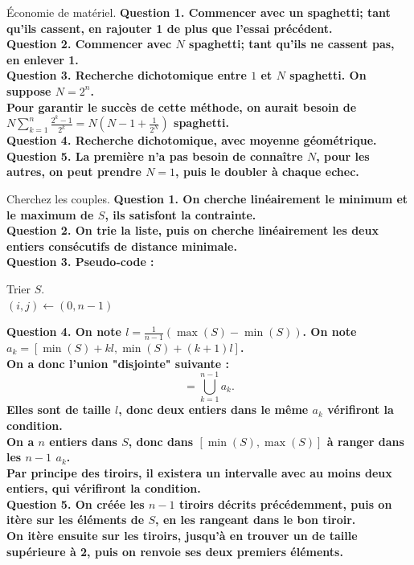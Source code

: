 \documentclass[french, 11pt]{article}
\begin{document}
\begin{exercice}{Économie de matériel.}{}
    \bf{Question 1.} Commencer avec un spaghetti; tant qu'ils cassent, en rajouter 1 de plus que l'essai précédent.\\
    \bf{Question 2.} Commencer avec $N$ spaghetti; tant qu'ils ne cassent pas, en enlever 1.\\
    \bf{Question 3.} Recherche dichotomique entre $1$ et $N$ spaghetti. On suppose $N=2^n$.\\
    Pour garantir le succès de cette méthode, on aurait besoin de $N\sum_{k=1}^n\frac{2^k-1}{2^k}=N(N-1+\frac{1}{2^N})$ spaghetti.\\
    \bf{Question 4.} Recherche dichotomique, avec moyenne géométrique.\\
    \bf{Question 5.} La première n'a pas besoin de connaître $N$, pour les autres, on peut prendre $N=1$, puis le doubler à chaque echec. 
\end{exercice}

\begin{exercice}{Cherchez les couples.}{}
    \bf{Question 1.} On cherche linéairement le minimum et le maximum de $S$, ils satisfont la contrainte.\\
    \bf{Question 2.} On trie la liste, puis on cherche linéairement les deux entiers consécutifs de distance minimale.\\
    \bf{Question 3.} Pseudo-code :\\
    \begin{algorithm}[H]
        \caption{}
        Trier $S$.\\
        $(i,j)\gets(0,n-1)$\\
    \end{algorithm}
    \bf{Question 4.} On note $l=\frac{1}{n-1}(\max(S)-\min(S))$. On note $a_k=[\min(S)+kl,\min(S)+(k+1)l]$.\\
    On a donc l'union "disjointe" suivante :
    \begin{equation*}
        [\min(S),\max(S)]=\bigcup_{k=1}^{n-1}a_k.
    \end{equation*}
    Elles sont de taille $l$, donc deux entiers dans le même $a_k$ vérifiront la condition.\\
    On a $n$ entiers dans $S$, donc dans $[\min(S),\max(S)]$ à ranger dans les $n-1$ $a_k$.\\
    Par principe des tiroirs, il existera un intervalle avec au moins deux entiers, qui vérifiront la condition.\\ 
    \bf{Question 5.} On créée les $n-1$ tiroirs décrits précédemment, puis on itère sur les éléments de $S$, en les rangeant dans le bon tiroir.\\
    On itère ensuite sur les tiroirs, jusqu'à en trouver un de taille supérieure à 2, puis on renvoie ses deux premiers éléments.
\end{exercice}
\end{document}

